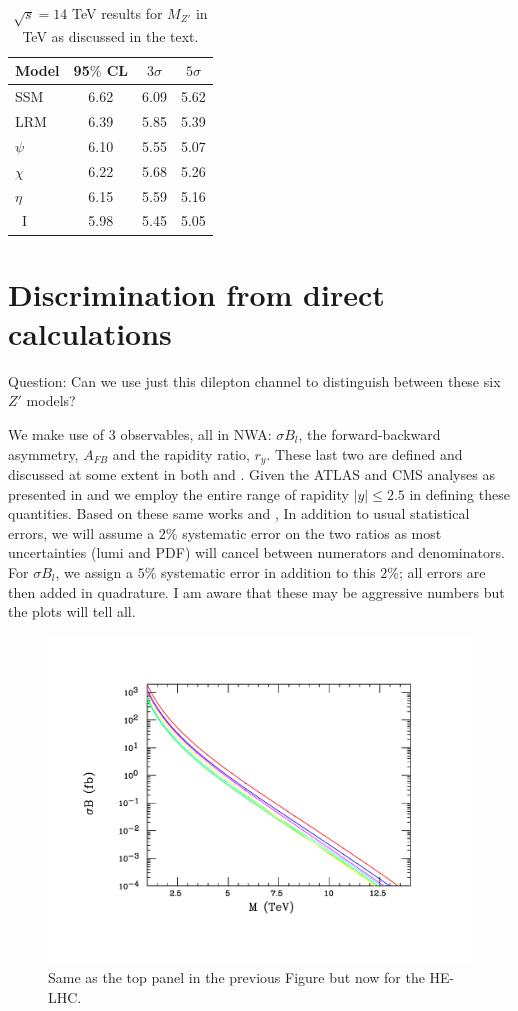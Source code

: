 \documentclass[14pt]{article}
\begin{document}
%
\begin{table}
\centering
\begin{tabular}{|l|c|c|c|} \hline\hline
  Model &   95$\%$ CL     &  $3\sigma$     &   $5\sigma$   \\
\hline
SSM    &     6.62     &  6.09        &  5.62     \\
LRM    &   6.39     & 5.85        & 5.39  \\
$\psi$    &  6.10   & 5.55   & 5.07  \\
$\chi$   &  6.22    & 5.68    & 5.26   \\
$\eta$   &  6.15     &  5.59  &  5.16   \\
~I        & 5.98   &  5.45   &  5.05  \\
\hline\hline
\end{tabular}
\caption{ $\sqrt s=14$ TeV results for $M_{Z'}$ in TeV as discussed in the text. }
\label{spec}
\end{table}
%


\section{Discrimination from direct calculations}
Question: Can we use just this dilepton channel to distinguish between these six $Z'$ models?  

We make use of 3 observables, all in NWA: $\sigma B_l$, the forward-backward asymmetry, $A_{FB}$ and the rapidity ratio, $r_y$. These last two are defined 
and discussed at some extent in both \cite{Rizzo:2014xma} and \cite{Han:2013mra}.  Given the ATLAS and CMS analyses as presented in \cite{Han:2016qpd} 
and \cite{CMS:2017zzj} we employ the entire range of rapidity $|y|\leq 2.5$ in defining these quantities. Based on these same works and \cite{Han:2013mra}, 
In addition to usual statistical errors, we will assume a $2\%$ systematic error on the two ratios as most uncertainties (lumi and PDF) will cancel between numerators 
and denominators. For $\sigma B_l$, we assign a $5\%$ systematic error in addition to this $2\%$; all errors are then added in quadrature. I am aware that these may 
be aggressive numbers but the plots will tell all. 


\begin{figure}[htbp]
  \centering
\includegraphics[trim={2cm 2cm 2cm 2cm},clip,width=0.49\columnwidth]{figures/zp27tev-ref.pdf}
\caption{ Same as the top panel in the previous Figure but now for the HE-LHC.}
\label{toy2}
\end{figure}
\end{document}
